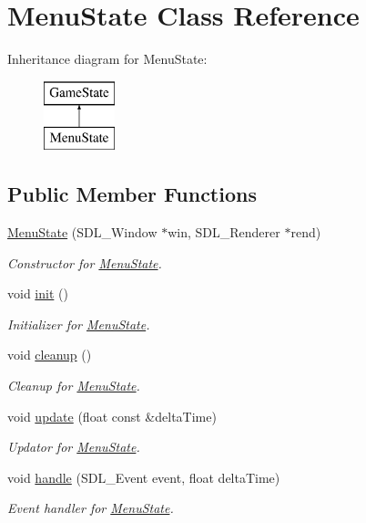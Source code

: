 \hypertarget{class_menu_state}{}\section{Menu\+State Class Reference}
\label{class_menu_state}
Inheritance diagram for Menu\+State\+:\begin{figure}[H]
\begin{center}
\leavevmode
\includegraphics[height=2.000000cm]{class_menu_state}
\end{center}
\end{figure}
\subsection*{Public Member Functions}
\begin{DoxyCompactItemize}
\item 
\hyperlink{class_menu_state_ae4b1263fcc33ec4229c51699b60fbb1e}{Menu\+State} (S\+D\+L\+\_\+\+Window $\ast$win, S\+D\+L\+\_\+\+Renderer $\ast$rend)
\begin{DoxyCompactList}\small\item\em Constructor for \hyperlink{class_menu_state}{Menu\+State}. \end{DoxyCompactList}\item 
void \hyperlink{class_menu_state_a137fc5233d29b03680b35ad1cec3b115}{init} ()
\begin{DoxyCompactList}\small\item\em Initializer for \hyperlink{class_menu_state}{Menu\+State}. \end{DoxyCompactList}\item 
void \hyperlink{class_menu_state_a8996ce14164c5958874633a753a08ed4}{cleanup} ()
\begin{DoxyCompactList}\small\item\em Cleanup for \hyperlink{class_menu_state}{Menu\+State}. \end{DoxyCompactList}\item 
void \hyperlink{class_menu_state_a323c751b4b12bd919738f48733550be1}{update} (float const \&delta\+Time)
\begin{DoxyCompactList}\small\item\em Updator for \hyperlink{class_menu_state}{Menu\+State}. \end{DoxyCompactList}\item 
void \hyperlink{class_menu_state_a5a57d15a22e61a120ca1d26ef4027110}{handle} (S\+D\+L\+\_\+\+Event event, float delta\+Time)
\begin{DoxyCompactList}\small\item\em Event handler for \hyperlink{class_menu_state}{Menu\+State}. \end{DoxyCompactList}\end{DoxyCompactItemize}
